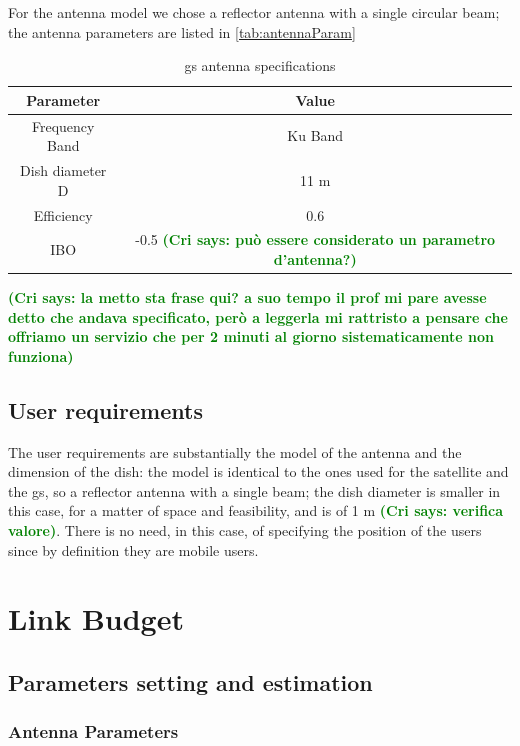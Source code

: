 \documentclass[11pt,a4paper,titlepage]{article}
\newcommand{\cri}[1]{\textcolor{green}{\textbf{(Cri says: #1)}}}
\begin{document}
		For the antenna model we chose a reflector antenna with a single circular beam; the antenna parameters are 					listed in \autoref{tab:antennaParam}
		\begin{table}
			\centering
			\begin{tabular}{cc}
			\toprule
			Parameter & Value\\
			\midrule
			Frequency Band & Ku Band\\
			Dish diameter D & 11 m\\
			Efficiency & 0.6\\
			IBO & -0.5 \cri{può essere considerato un parametro d'antenna?}\\
			\bottomrule
			\end{tabular}
			\caption{\gls{gs} antenna specifications}
			\label{tab:antennaParam}
		\end{table}

\cri{la metto sta frase qui? a suo tempo il prof mi pare avesse detto che andava specificato, però a leggerla mi rattristo a pensare che offriamo un servizio che per 2 minuti al giorno sistematicamente non funziona}
	\subsection{User requirements}
The user requirements are substantially the model of the antenna and the dimension of the dish: the model is identical to the ones used for the satellite and the \gls{gs}, so a reflector antenna with a single beam; the dish diameter is smaller in this case, for a matter of space and feasibility, and is of 1 m \cri{verifica valore}. There is no need, in this case, of specifying the position of the users since by definition they are mobile users.

\section{Link Budget}
	\subsection{Parameters setting and estimation}
		\subsubsection{Antenna Parameters}
\end{document}
